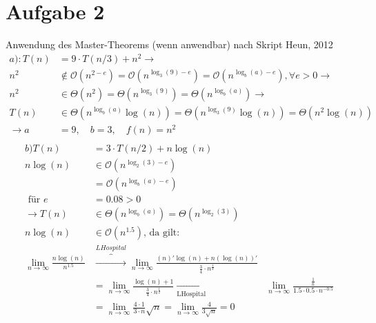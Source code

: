 \documentclass[a4paper,10pt,oneside,leqno]{scrartcl}
\begin{document}
\section*{Aufgabe 2} \setcounter{equation}{1}
Anwendung des Master-Theorems (wenn anwendbar) nach Skript Heun, 2012\\
\begin{align*}
  a): T(n) &= 9 \cdot T(n/3) + n^2 \rightarrow\\
     n^2 &\notin \mathcal{O}(n^{2-e}) = \mathcal{O}(n^{\log_3(9)-e}) = \mathcal{O}(n^{\log_b(a)-e}), \forall e > 0 \rightarrow\\
     n^2 &\in \Theta(n^2) = \Theta(n^{\log_3(9)}) = \Theta(n^{\log_b(a)}) \rightarrow\\
     T(n) &\in \Theta(n^{\log_b(a)}\log(n)) = \Theta(n^{\log_3(9)}\log(n)) = \Theta(n^2\log(n))\\
     \rightarrow a &= 9, \quad b = 3, \quad f(n) = n^2\\
\end{align*}
\begin{align*}
  b)T(n)&= 3 \cdot T(n/2) + n \log(n)\\
   n \log(n) &\in \mathcal{O}(n^{\log_2(3)-e})\\
   &= \mathcal{O}(n^{\log_b(a)-e})\\
   \text{ für } e &= 0.08 > 0 \\
   \rightarrow T(n) &\in \Theta(n^{\log_b(a)}) = \Theta(n^{\log_2(3)})\\
  n \log(n) &\in \mathcal{O}(n^{1.5}) \text{, da gilt:}\\
    \lim_{n \to \infty} \frac{n \log(n)}{n^{1.5}} &\overbrace{\rightarrow}^{LHospital}\lim_{n \to \infty} \frac{(n)' \log(n) + n (\log(n))'}{\frac{3}{4} \cdot n^{\frac{1}{2}}}\\
    &= \lim_{n \to \infty} \frac{\log(n)+1}{\frac{3}{4} \cdot n^{\frac{1}{2}}}
     \underset{\text{LHospital}}{\rightarrow}& \lim_{n \to \infty} \frac{\frac{1}{n}}{1.5 \cdot 0.5 \cdot n^{-0.5}} \\
     &=\lim_{n \to \infty} \frac{4\cdot1}{3\cdot n}\sqrt{n} = \lim_{n \to \infty} \frac{4}{3\sqrt{n}} = 0\\
\end{align*}
\end{document}
